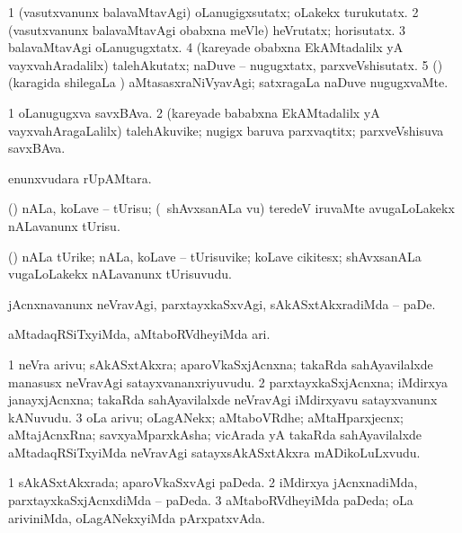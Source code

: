 \bentry
{}
\gl{\kirxvi}
\bmng
\bnum
\num{1} (vasutxvanunx balavaMtavAgi) oLanugigxsutatx; oLakekx turukutatx. 
\num{2} (vasutxvanunx balavaMtavAgi obabxna meVle) heVrutatx; horisutatx. 
\num{3} balavaMtavAgi oLanugugxtatx. 
\num{4} (kareyade obabxna EkAMtadalilx yA vayxvahAradalilx) talehAkutatx; naDuve -- nugugxtatx, parxveVshisutatx. 
\num{5} (\BUvi) (karagida shilegaLa \vi) aMtasasxraNiVyavAgi; satxragaLa naDuve nugugxvaMte. 
\enum
\emng
\eentry

\bentry
{}
\gl{\nA}
\bmng
\bnum
\num{1} oLanugugxva savxBAva. 
\num{2} (kareyade bababxna EkAMtadalilx yA vayxvahAragaLalilx) talehAkuvike; nugigx baruva parxvaqtitx; parxveVshisuva savxBAva. 
\enum
\emng
\eentry

\bentry
{}
\gl{\sakirx}
\bmng
{} enunxvudara rUpAMtara. 
\emng
\eentry

\bentry
{}
\gl{\sakirx}
\bmng
(\veYshA) nALa, koLave -- tUrisu; (\kanmu\ shAvxsanALa \mo vu) teredeV iruvaMte avugaLoLakekx nALavanunx tUrisu. 
\emng
\eentry

\bentry
{}
\gl{\nA}
\bmng
(\veYshA) nALa tUrike; nALa, koLave -- tUrisuvike; koLave cikitesx; shAvxsanALa \mo vugaLoLakekx nALavanunx tUrisuvudu. 
\emng
\eentry

\bentry
{}
\gl{\sakirx}
\bmng
jAcnxnavanunx neVravAgi, parxtayxkaSxvAgi, sAkASxtAkxradiMda -- paDe. 
\emng

\noindent 
\gl{\akirx}
\bmng
aMtadaqRSiTxyiMda, aMtaboRVdheyiMda ari. 
\emng
\eentry

\bentry
{}
\gl{\nA}
\bmng
\bnum
\num{1} neVra arivu; sAkASxtAkxra; aparoVkaSxjAcnxna; takaRda sahAyavilalxde manasusx neVravAgi satayxvananxriyuvudu. 
\num{2} parxtayxkaSxjAcnxna; iMdirxya janayxjAcnxna; takaRda sahAyavilalxde neVravAgi iMdirxyavu satayxvanunx kANuvudu. 
\num{3} oLa arivu; oLagANekx; aMtaboVRdhe; aMtaHparxjecnx; aMtajAcnxRna; savxyaMparxkAsha; vicArada yA takaRda sahAyavilalxde aMtadaqRSiTxyiMda neVravAgi satayxsAkASxtAkxra mADikoLuLxvudu. 
\enum
\emng
\eentry

\bentry
{}
\gl{\gu}
\bmng
\bnum
\num{1} sAkASxtAkxrada; aparoVkaSxvAgi paDeda. 
\num{2} iMdirxya jAcnxnadiMda, parxtayxkaSxjAcnxdiMda -- paDeda. 
\num{3} aMtaboRVdheyiMda paDeda; oLa ariviniMda, oLagANekxyiMda pArxpatxvAda. 
\enum
\emng
\eentry

